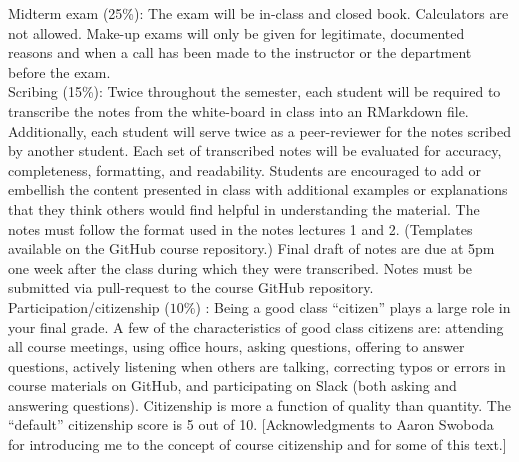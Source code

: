\documentclass[10pt]{article}
\begin{document}
\noindent Midterm exam (25\%): The exam will be in-class and closed book. Calculators are not allowed. Make-up exams will only be given for legitimate, documented reasons and when a call has been made to the instructor or the department before the exam. \\

\noindent Scribing (15\%): Twice throughout the semester, each student will be required to transcribe the notes from the white-board in class into an RMarkdown file. Additionally, each student will serve twice as a peer-reviewer for the notes scribed by another student. Each set of transcribed notes will be evaluated for accuracy, completeness, formatting, and readability. Students are encouraged to add or embellish the content presented in class with additional examples or explanations that they think others would find helpful in understanding the material. The notes must follow the format used in the notes lectures 1 and 2. (Templates available on the GitHub course repository.) Final draft of notes are due at 5pm one week after the class during which they were transcribed. Notes must be submitted via pull-request to the course GitHub repository. \\

\noindent Participation/citizenship ($10\%$) :
Being a good class ``citizen'' plays a large role in your final grade. A few of the characteristics of good class citizens are: attending all course meetings, using office hours, asking questions, offering to answer questions, actively listening when others are talking, correcting typos or errors in course materials on GitHub, and participating on Slack (both asking and answering questions). Citizenship is more a function of quality than quantity. The ``default'' citizenship score is 5 out of 10. [Acknowledgments to Aaron Swoboda for introducing me to the concept of course citizenship and for some of this text.] \\
\end{document}
